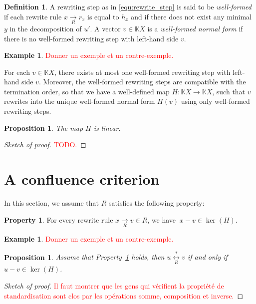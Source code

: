\documentclass[10pt]{easychair}
\newtheorem{proposition}[theorem]{Proposition}
\theoremstyle{definition}
\newtheorem{definition}[theorem]{Definition}
\newtheorem{property}[theorem]{Property}
\newtheorem{example}[theorem]{Example}
\newcommand\K{\mathbb{K}}
\newcommand\KX{\K X}
\newcommand\rewR{\underset{R}{\longrightarrow}}
\newcommand\equivR{\underset{R}{\overset{*}{\longleftrightarrow}}}
\newcommand\todo[1]{\textcolor{red}{#1.}}
\begin{document}
\begin{definition}
  A rewriting step as in \eqref{equ:rewrite_step} is said to be
  \emph{well-formed} if each rewrite rule $x\rewR r_x$ is equal to $h_x$
  and if there does not exist any minimal $y$ in the decomposition of
  $u'$. A vector $v\in\KX$ is a \emph{well-formed normal form} if there
  is no well-formed rewriting step with left-hand side $v$.
\end{definition}

\begin{example}
\todo{Donner un exemple et un contre-exemple}
\end{example}

For each $v\in\KX$, there exists at most one well-formed rewriting step
with left-hand side $v$. Moreover, the well-formed rewriting steps are
compatible with the termination order, so that we have a well-defined map
$H:\KX\to\KX$, such that $v$ rewrites into the unique well-formed normal
form $H(v)$ using only well-formed rewriting steps.

\begin{proposition}\label{prop:linearity_of_H}
  The map $H$ is linear.
\end{proposition}

\begin{proof}[Sketch of proof]
  \todo{TODO}
\end{proof}

\section{A confluence criterion}

In this section, we assume that $R$ satisfies the following property:
\begin{property}\label{proper;standardisation_property}
  For every rewrite rule $x\rewR v\in R$, we have $\ x-v\in\ker(H)$.
\end{property}

\begin{example}
\todo{Donner un exemple et un contre-exemple}
\end{example}

\begin{proposition}\label{prop:equationnal_theory}
  Assume that Property~\ref{proper;standardisation_property} holds, then
  $u\equivR v$ if and only if $u-v\in\ker(H)$.
\end{proposition}

\begin{proof}[Sketch of proof]
  \todo{Il faut montrer que les gens qui vérifient la propriété de
    standardisation sont clos par les opérations somme, composition et
    inverse}
\end{proof}
\end{document}
